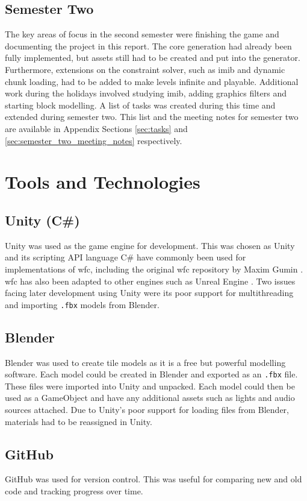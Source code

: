 \subsection{Semester Two}
The key areas of focus in the second semester were finishing the game and documenting the project in this report. The core generation had already been fully implemented, but assets still had to be created and put into the generator. Furthermore, extensions on the constraint solver, such as \acrlong{imib} and dynamic chunk loading, had to be added to make levels infinite and playable. Additional work during the holidays involved studying \acrlong{imib}, adding graphics filters and starting block modelling. A list of tasks was created during this time and extended during semester two. This list and the meeting notes for semester two are available in Appendix Sections \ref{sec:tasks} and \ref{sec:semester_two_meeting_notes} respectively.

\section{Tools and Technologies}
\subsection{Unity (C\#)}
Unity was used as the game engine for development. This was chosen as Unity and its scripting API language C\# have commonly been used for implementations of \acrlong{wfc}, including the original \acrshort{wfc} repository by Maxim Gumin \cite{Gumin_Wave_Function_Collapse_2016}. \acrshort{wfc} has also been adapted to other engines such as Unreal Engine \cite{unreal_engine_WFC}. Two issues facing later development using Unity were its poor support for multithreading and importing \texttt{.fbx} models from Blender.

\subsection{Blender}
Blender was used to create tile models as it is a free but powerful modelling software. Each model could be created in Blender and exported as an \texttt{.fbx} file. These files were imported into Unity and unpacked. Each model could then be used as a GameObject and have any additional assets such as lights and audio sources attached. Due to Unity's poor support for loading files from Blender, materials had to be reassigned in Unity.

\subsection{GitHub}
GitHub was used for version control. This was useful for comparing new and old code and tracking progress over time.

